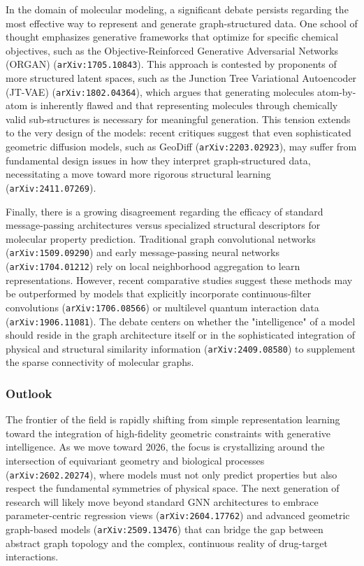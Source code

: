 \documentclass[11pt]{article}
\begin{document}
In the domain of molecular modeling, a significant debate persists regarding the most effective way to represent and generate graph-structured data. One school of thought emphasizes generative frameworks that optimize for specific chemical objectives, such as the Objective-Reinforced Generative Adversarial Networks (ORGAN) (\texttt{arXiv:1705.10843}). This approach is contested by proponents of more structured latent spaces, such as the Junction Tree Variational Autoencoder (JT-VAE) (\texttt{arXiv:1802.04364}), which argues that generating molecules atom-by-atom is inherently flawed and that representing molecules through chemically valid sub-structures is necessary for meaningful generation. This tension extends to the very design of the models: recent critiques suggest that even sophisticated geometric diffusion models, such as GeoDiff (\texttt{arXiv:2203.02923}), may suffer from fundamental design issues in how they interpret graph-structured data, necessitating a move toward more rigorous structural learning (\texttt{arXiv:2411.07269}).

Finally, there is a growing disagreement regarding the efficacy of standard message-passing architectures versus specialized structural descriptors for molecular property prediction. Traditional graph convolutional networks (\texttt{arXiv:1509.09290}) and early message-passing neural networks (\texttt{arXiv:1704.01212}) rely on local neighborhood aggregation to learn representations. However, recent comparative studies suggest these methods may be outperformed by models that explicitly incorporate continuous-filter convolutions (\texttt{arXiv:1706.08566}) or multilevel quantum interaction data (\texttt{arXiv:1906.11081}). The debate centers on whether the "intelligence" of a model should reside in the graph architecture itself or in the sophisticated integration of physical and structural similarity information (\texttt{arXiv:2409.08580}) to supplement the sparse connectivity of molecular graphs.

\subsubsection{Outlook}

The frontier of the field is rapidly shifting from simple representation learning toward the integration of high-fidelity geometric constraints with generative intelligence. As we move toward 2026, the focus is crystallizing around the intersection of equivariant geometry and biological processes (\texttt{arXiv:2602.20274}), where models must not only predict properties but also respect the fundamental symmetries of physical space. The next generation of research will likely move beyond standard GNN architectures to embrace parameter-centric regression views (\texttt{arXiv:2604.17762}) and advanced geometric graph-based models (\texttt{arXiv:2509.13476}) that can bridge the gap between abstract graph topology and the complex, continuous reality of drug-target interactions.
\end{document}
